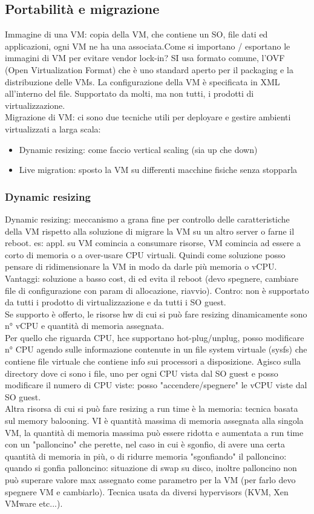 \documentclass{article}
\begin{document}
\subsection{Portabilità e migrazione}
Immagine di una VM: copia della VM, che contiene un SO, file dati ed applicazioni, ogni VM ne ha una associata.Come si importano / esportano le immagini di VM per evitare vendor lock-in? SI usa formato comune, l'OVF (Open Virtualization Format) che è uno standard aperto per il packaging e la distribuzione delle VMs. La configurazione della VM è specificata in XML all'interno del file. Supportato da molti, ma non tutti, i prodotti di virtualizzazione.\\ Migrazione di VM: ci sono due tecniche utili per deployare e gestire ambienti virtualizzati a larga scala:
\begin{itemize}
\item Dynamic resizing: come faccio vertical scaling (sia up che down)
\item Live migration: sposto la VM su differenti macchine fisiche senza stopparla
\end{itemize}
\subsubsection{Dynamic resizing}
Dynamic resizing: meccanismo a grana fine per controllo delle caratteristiche della VM rispetto alla soluzione di migrare la VM su un altro server o farne il reboot. es: appl. su VM comincia a consumare risorse, VM comincia ad essere a corto di memoria o a over-usare CPU virtuali. Quindi come soluzione posso pensare di ridimensionare la VM in  modo da darle più memoria o vCPU.\\ Vantaggi: soluzione a basso cost, di ed evita il reboot (devo spegnere, cambiare file di configurazione con param di allocazione, riavvio). Contro: non è supportato da tutti i prodotto di virtualizzazione e da tutti i SO guest.\\ Se supporto è offerto, le risorse hw di cui si può fare resizing dinamicamente sono n° vCPU e quantità di memoria assegnata.\\ Per quello che riguarda CPU, hce supportano hot-plug/unplug, posso modificare n° CPU agendo sulle informazione contenute in un file system virtuale (sysfs) che contiene file virtuale che contiene info sui processori a disposizione. Agisco sulla directory dove ci sono i file, uno per ogni CPU vista dal SO guest e posso modificare il numero di CPU viste: posso "accendere/spegnere" le vCPU viste dal SO guest.\\ Altra risorsa di cui si può fare resizing a run time è la memoria: tecnica basata sul memory balooning. VI è quantità massima di memoria assegnata alla singola VM, la quantità di memoria massima può essere ridotta e aumentata a run time con un "palloncino" che perette, nel caso in cui è sgonfio, di avere una certa quantità di memoria in più, o di ridurre memoria "sgonfiando" il palloncino: quando si gonfia palloncino: situazione di swap su disco, inoltre palloncino non può superare valore max assegnato come parametro per la VM (per farlo devo spegnere VM e cambiarlo). Tecnica usata da diversi hypervisors (KVM, Xen VMware etc...).
\end{document}
